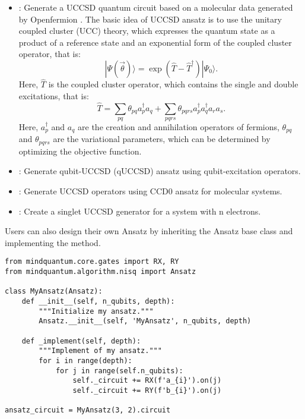 \begin{itemize}
    \item \generateuccsd: Generate a UCCSD quantum circuit based on a molecular data generated by Openfermion \cite{mcclean2020openfermion}. The basic idea of UCCSD ansatz is to use the unitary coupled cluster (UCC) theory, which expresses the quantum state as a product of a reference state and an exponential form of the coupled cluster operator, that is:
          $$
              |\Psi(\vec{\theta})\rangle = \exp(\hat{T} - \hat{T}^\dagger)|\Psi_0\rangle.
          $$
          Here, $\hat{T}$ is the coupled cluster operator, which contains the single and double excitations, that is:
          $$
              \hat{T} = \sum_{pq}\theta_{pq}a_p^\dagger a_q + \sum_{pqrs}\theta_{pqrs}a_p^\dagger a_q^\dagger a_r a_s.
          $$
          Here, $a_p^\dagger$ and $a_q$ are the creation and annihilation operators of fermions, $\theta_{pq}$ and $\theta_{pqrs}$ are the variational parameters, which can be determined by optimizing the objective function.

    \item \quccsdgenerator: Generate qubit-UCCSD (qUCCSD) ansatz using qubit-excitation operators.
    \item \uccsdzerosingletgenerator: Generate UCCSD operators using CCD0 ansatz for molecular systems.
    \item \uccsdsingletgenerator: Create a singlet UCCSD generator for a system with n electrons.
\end{itemize}

Users can also design their own Ansatz by inheriting the Ansatz base class and implementing the  method.

\begin{lstlisting}
from mindquantum.core.gates import RX, RY
from mindquantum.algorithm.nisq import Ansatz

class MyAnsatz(Ansatz):
    def __init__(self, n_qubits, depth):
        """Initialize my ansatz."""
        Ansatz.__init__(self, 'MyAnsatz', n_qubits, depth)

    def _implement(self, depth):
        """Implement of my ansatz."""
        for i in range(depth):
            for j in range(self.n_qubits):
                self._circuit += RX(f'a_{i}').on(j)
                self._circuit += RY(f'b_{i}').on(j)

ansatz_circuit = MyAnsatz(3, 2).circuit
\end{lstlisting}